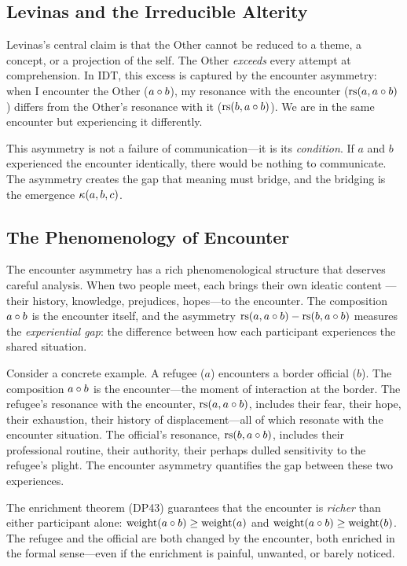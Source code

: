 \subsection{Levinas and the Irreducible Alterity}

Levinas's central claim is that the Other cannot be reduced to a theme, a
concept, or a projection of the self.  The Other \emph{exceeds} every attempt
at comprehension.  In IDT, this excess is captured by the encounter asymmetry:
when I encounter the Other ($a \circ b$), my resonance with the encounter
($\mathrm{rs}(a, a \circ b)$) differs from the Other's resonance with it
($\mathrm{rs}(b, a \circ b)$).  We are in the same encounter but experiencing
it differently.

This asymmetry is not a failure of communication---it is its \emph{condition}.
If $a$ and $b$ experienced the encounter identically, there would be nothing
to communicate.  The asymmetry creates the gap that meaning must bridge, and
the bridging is the emergence $\kappa(a, b, c)$.

\subsection{The Phenomenology of Encounter}

The encounter asymmetry has a rich phenomenological structure that deserves
careful analysis.  When two people meet, each brings their own ideatic content
---their history, knowledge, prejudices, hopes---to the encounter.  The
composition $a \circ b$ is the encounter itself, and the asymmetry
$\mathrm{rs}(a, a \circ b) - \mathrm{rs}(b, a \circ b)$ measures the \emph{experiential
gap}: the difference between how each participant experiences the shared
situation.

Consider a concrete example.  A refugee ($a$) encounters a border official
($b$).  The composition $a \circ b$ is the encounter---the moment of
interaction at the border.  The refugee's resonance with the encounter,
$\mathrm{rs}(a, a \circ b)$, includes their fear, their hope, their exhaustion,
their history of displacement---all of which resonate with the encounter
situation.  The official's resonance, $\mathrm{rs}(b, a \circ b)$, includes their
professional routine, their authority, their perhaps dulled sensitivity to
the refugee's plight.  The encounter asymmetry quantifies the gap between
these two experiences.

The enrichment theorem (DP43) guarantees that the encounter is \emph{richer}
than either participant alone: $\mathrm{weight}(a \circ b) \geq
\mathrm{weight}(a)$ and $\mathrm{weight}(a \circ b) \geq
\mathrm{weight}(b)$.  The refugee and the official are both changed by the
encounter, both enriched in the formal sense---even if the enrichment is
painful, unwanted, or barely noticed.

